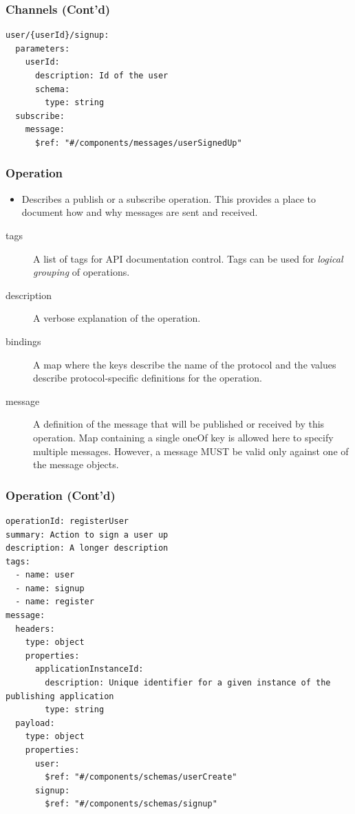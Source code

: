 \documentclass{efd-lecture}
\begin{document}
\begin{frame}[fragile]
  \frametitle{Channels (Cont'd)}
  \scriptsize
  \begin{verbatim}
user/{userId}/signup:
  parameters:
    userId:
      description: Id of the user
      schema:
        type: string
  subscribe:
    message:
      $ref: "#/components/messages/userSignedUp"
  \end{verbatim}
\end{frame}

\begin{frame}[fragile]
  \frametitle{Operation}
  \begin{itemize}
    \item Describes a publish or a subscribe operation. This provides a place to document how and why messages are sent and received.
  \end{itemize}
  \begin{description}
    \item[tags] A list of tags for API documentation control. Tags can be used for \textit{\color{YellowOrange} logical grouping} of operations.
    \item[description] A verbose explanation of the operation.
    \item[bindings] A map where the keys describe the name of the protocol and the values describe protocol-specific definitions for the operation.
    \item[message] A definition of the message that will be published or received by this operation. Map containing a single oneOf key is allowed here to specify multiple messages.
      However, a message MUST be valid only against one of the message objects.
  \end{description}
\end{frame}

\begin{frame}[fragile]
  \frametitle{Operation (Cont'd)}
  \scriptsize
  \begin{verbatim}
operationId: registerUser
summary: Action to sign a user up
description: A longer description
tags:
  - name: user
  - name: signup
  - name: register
message:
  headers:
    type: object
    properties:
      applicationInstanceId:
        description: Unique identifier for a given instance of the publishing application
        type: string
  payload:
    type: object
    properties:
      user:
        $ref: "#/components/schemas/userCreate"
      signup:
        $ref: "#/components/schemas/signup"
  \end{verbatim}
\end{frame}
\end{document}
